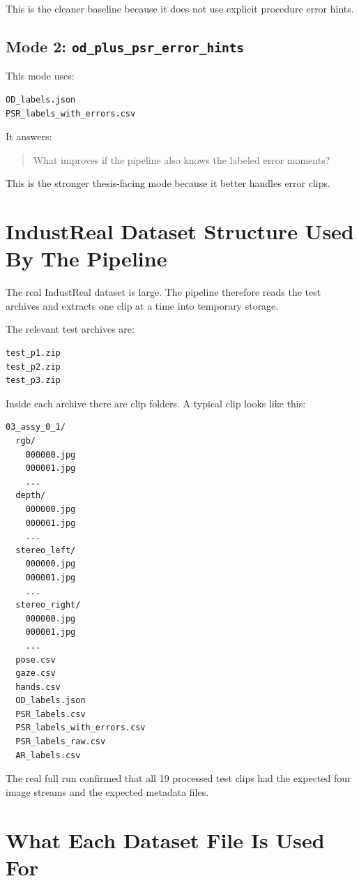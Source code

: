 \documentclass[11pt,a4paper]{article}
\begin{document}
This is the cleaner baseline because it does not use explicit procedure error hints.

\subsection{Mode 2: \texttt{od\_plus\_psr\_error\_hints}}

This mode uses:

\begin{lstlisting}
OD_labels.json
PSR_labels_with_errors.csv
\end{lstlisting}

It answers:

\begin{quote}
What improves if the pipeline also knows the labeled error moments?
\end{quote}

This is the stronger thesis-facing mode because it better handles error clips.

\section{IndustReal Dataset Structure Used By The Pipeline}

The real IndustReal dataset is large. The pipeline therefore reads the test archives and extracts one clip at a time into temporary storage.

The relevant test archives are:

\begin{lstlisting}
test_p1.zip
test_p2.zip
test_p3.zip
\end{lstlisting}

Inside each archive there are clip folders. A typical clip looks like this:

\begin{lstlisting}
03_assy_0_1/
  rgb/
    000000.jpg
    000001.jpg
    ...
  depth/
    000000.jpg
    000001.jpg
    ...
  stereo_left/
    000000.jpg
    000001.jpg
    ...
  stereo_right/
    000000.jpg
    000001.jpg
    ...
  pose.csv
  gaze.csv
  hands.csv
  OD_labels.json
  PSR_labels.csv
  PSR_labels_with_errors.csv
  PSR_labels_raw.csv
  AR_labels.csv
\end{lstlisting}

The real full run confirmed that all 19 processed test clips had the expected four image streams and the expected metadata files.

\section{What Each Dataset File Is Used For}
\end{document}
